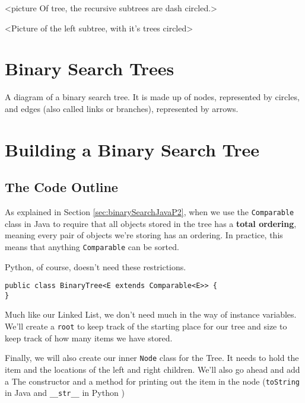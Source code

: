 <picture Of tree, the recursive subtrees are dash circled.>

<Picture of the left subtree, with it's trees circled>




















\section{Binary Search Trees}

A diagram of a binary search tree.  It is made up of nodes, represented by circles, and edges (also called links or branches), represented by arrows.  



\section{Building a Binary Search Tree}

\subsection{The Code Outline}


As explained in Section \ref{sec:binarySearchJavaP2}, when we use the \texttt{Comparable} class in Java to require that all objects stored in the tree has a \textbf{total ordering}, meaning every pair of objects we're storing has an ordering.
In practice, this means that anything \texttt{Comparable} can be sorted.

Python, of course, doesn't need these restrictions.
\begin{verbatim}
public class BinaryTree<E extends Comparable<E>> {
}
\end{verbatim}




Much like our Linked List, we don't need much in the way of instance variables.  We'll create a \texttt{root} to keep track of the starting place for our tree and size to keep track of how many items we have stored.

Finally, we will also create our inner \texttt{Node} class for the Tree.
It needs to hold the item and the locations of the left and right children.
We'll also go ahead and add a The constructor and a method for printing out the item in the node (\texttt{toString} in Java and \texttt{\_\_str\_\_} in Python )

